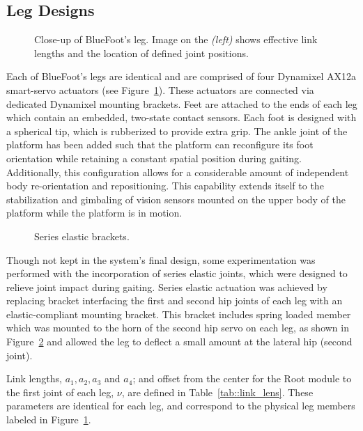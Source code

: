 		\subsection{Leg Designs}

			\begin{figure}[h!]
				\centering
				\caption{Close-up of BlueFoot's leg. Image on the \emph{(left)} shows effective link lengths and the location of defined joint positions.}
				\label{fig::leg_labeled}
			\end{figure}
				
			Each of BlueFoot's legs are identical and are comprised of four Dynamixel AX12a smart-servo actuators (see Figure~\ref{fig::leg_labeled}). These actuators are connected via dedicated Dynamixel mounting brackets. Feet are attached to the ends of each leg which contain an embedded, two-state contact sensors. Each foot is designed with a spherical tip, which is rubberized to provide extra grip. The ankle joint of the platform has been added such that the platform can reconfigure its foot orientation while retaining a constant spatial position during gaiting. Additionally, this configuration allows for a considerable amount of independent body re-orientation and repositioning. This capability extends itself to the stabilization and gimbaling of vision sensors mounted on the upper body of the platform while the platform is in motion.
		
			\begin{figure}[h!]
				\centering
				\caption{Series elastic brackets.}
				\label{fig::sea_bracket}
			\end{figure}

			Though not kept in the system's final design, some experimentation was performed with the incorporation of series elastic joints, which were designed to relieve joint impact during gaiting. Series elastic actuation was achieved by replacing bracket interfacing the first and second hip joints of each leg with an elastic-compliant mounting bracket. This bracket includes spring loaded member which was mounted to the horn of the second hip servo on each leg, as shown in Figure~\ref{fig::sea_bracket} and allowed the leg to deflect a small amount at the lateral hip (second joint).

			Link lengths, $a_{1}, a_{2}, a_{3}$ and $a_{4}$; and offset from the center for the Root module to the first joint of each leg, $\nu$, are defined in Table~\ref{tab::link_lens}. These parameters are identical for each leg, and correspond to the physical leg members labeled in Figure~\ref{fig::leg_labeled}.

